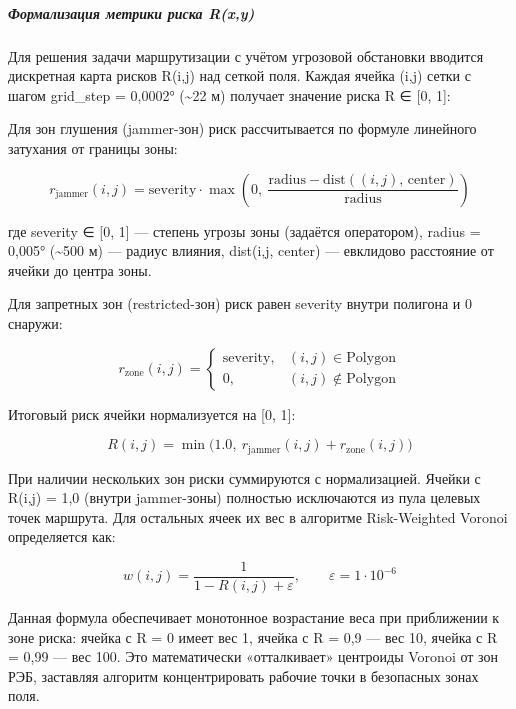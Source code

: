 \documentclass[14pt,a4paper]{extarticle}
\begin{document}
\hypertarget{ux444ux43eux440ux43cux430ux43bux438ux437ux430ux446ux438ux44f-ux43cux435ux442ux440ux438ux43aux438-ux440ux438ux441ux43aux430-rxy}{%
\subparagraph{Формализация метрики риска R(x,y)}\label{ux444ux43eux440ux43cux430ux43bux438ux437ux430ux446ux438ux44f-ux43cux435ux442ux440ux438ux43aux438-ux440ux438ux441ux43aux430-rxy}}

Для решения задачи маршрутизации с учётом угрозовой обстановки вводится дискретная карта рисков R(i,j) над сеткой поля. Каждая ячейка (i,j) сетки с шагом grid\_step = 0,0002° (\textasciitilde22 м) получает значение риска R ∈ {[}0, 1{]}:

Для зон глушения (jammer-зон) риск рассчитывается по формуле линейного затухания от границы зоны:

\[r_{\mathrm{jammer}}(i,j) = \mathrm{severity} \cdot \max\!\left(0,\ \frac{\mathrm{radius} - \mathrm{dist}((i,j),\, \mathrm{center})}{\mathrm{radius}}\right)\]

где severity ∈ {[}0, 1{]} --- степень угрозы зоны (задаётся оператором), radius = 0,005° (\textasciitilde500 м) --- радиус влияния, dist(i,j, center) --- евклидово расстояние от ячейки до центра зоны.

Для запретных зон (restricted-зон) риск равен severity внутри полигона и 0 снаружи:

\[r_{\mathrm{zone}}(i,j) = \begin{cases} \mathrm{severity}, & (i,j) \in \mathrm{Polygon} \\ 0, & (i,j) \notin \mathrm{Polygon} \end{cases}\]

Итоговый риск ячейки нормализуется на {[}0, 1{]}:

\[R(i,j) = \min\!\bigl(1.0,\ r_{\mathrm{jammer}}(i,j) + r_{\mathrm{zone}}(i,j)\bigr)\]

При наличии нескольких зон риски суммируются с нормализацией. Ячейки с R(i,j) = 1,0 (внутри jammer-зоны) полностью исключаются из пула целевых точек маршрута. Для остальных ячеек их вес в алгоритме Risk-Weighted Voronoi определяется как:

\[w(i,j) = \frac{1}{1 - R(i,j) + \varepsilon},\qquad \varepsilon = 1 \cdot 10^{-6}\]

Данная формула обеспечивает монотонное возрастание веса при приближении к зоне риска: ячейка с R = 0 имеет вес 1, ячейка с R = 0,9 --- вес 10, ячейка с R = 0,99 --- вес 100. Это математически «отталкивает» центроиды Voronoi от зон РЭБ, заставляя алгоритм концентрировать рабочие точки в безопасных зонах поля.
\end{document}
